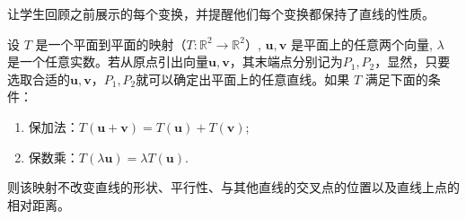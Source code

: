 \begin{note}
  让学生回顾之前展示的每个变换，并提醒他们每个变换都保持了直线的性质。
\end{note}

\begin{proposition}[平面上保持直线性质的变换]
\label{thm:保持直线性质的变换}
设 $T$ 是一个平面到平面的映射（$T: \mathbb{R}^2 \rightarrow \mathbb{R}^2$）, $\boldsymbol{u}, \boldsymbol{v}$ 是平面上的任意两个向量, $\lambda$ 是一个任意实数。若从原点引出向量$\boldsymbol{u}, \boldsymbol{v}$，其末端点分别记为$P_1,P_2$，显然，只要选取合适的$\boldsymbol{u}, \boldsymbol{v}$，$P_1,P_2$就可以确定出平面上的任意直线。如果 $T$ 满足下面的条件：
\begin{enumerate}
    \item 保加法：$T(\boldsymbol{u}+\boldsymbol{v}) = T(\boldsymbol{u})+T(\boldsymbol{v})$;
    \item 保数乘：$T(\lambda \boldsymbol{u}) =\lambda T(\boldsymbol{u})$.
\end{enumerate}
则该映射不改变直线的形状、平行性、与其他直线的交叉点的位置以及直线上点的相对距离。
\end{proposition}


